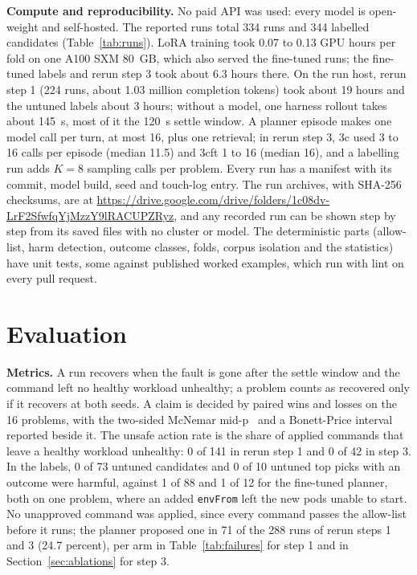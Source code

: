 \documentclass[10pt,conference]{IEEEtran}
\newcommand{\code}[1]{\texttt{\upshape #1}}
\begin{document}
\textbf{Compute and reproducibility.} No paid API was used: every model is open-weight and
self-hosted. The reported runs total 334 runs and 344 labelled candidates (Table~\ref{tab:runs}).
LoRA training took 0.07 to 0.13 GPU hours per fold on one A100 SXM 80~GB, which also served the
fine-tuned runs; the fine-tuned labels and rerun step 3 took about 6.3 hours there. On the run host,
rerun step 1 (224 runs, about 1.03 million completion tokens) took about 19 hours and the untuned
labels about 3 hours; without a model, one harness rollout takes about 145~s, most of it the
120~s settle window. A planner episode makes one model call per turn, at most 16, plus one
retrieval; in rerun step 3, 3c used 3 to 16 calls per episode (median 11.5) and 3cft 1 to 16
(median 16), and a labelling run adds $K=8$ sampling calls per problem. Every run has a manifest
with its commit, model build, seed and touch-log entry. The run archives, with SHA-256 checksums,
are at \url{https://drive.google.com/drive/folders/1c08dv-LrF2SfwfqYjMzzY9lRACUPZRyz}, and any
recorded run can be shown step by step from its saved files with no cluster or model. The
deterministic parts (allow-list, harm detection, outcome classes, folds, corpus isolation and the
statistics) have unit tests, some against published worked examples, which run with lint on every
pull request.

\section{Evaluation}
\label{sec:eval}

\textbf{Metrics.} A run recovers when the fault is gone after the settle window and the command
left no healthy workload unhealthy; a problem counts
as recovered only if it recovers at both seeds. A claim is decided by paired wins and losses on the
16 problems, with the two-sided McNemar mid-p~\cite{fagerland} and a Bonett-Price interval~\cite{bonett}
reported beside it. The unsafe action rate is the share of applied commands that leave a healthy
workload unhealthy: 0 of 141 in rerun step 1 and 0 of 42 in step 3. In the labels, 0 of 73 untuned
candidates and 0 of 10 untuned top picks with an outcome were harmful, against 1 of 88 and 1 of 12
for the fine-tuned planner, both on one problem, where an added \code{envFrom} left the new pods
unable to start. No unapproved command was applied, since every command passes the allow-list
before it runs; the planner proposed one in 71 of the 288 runs of rerun steps 1 and 3 (24.7
percent), per arm in Table~\ref{tab:failures} for step 1 and in Section~\ref{sec:ablations} for
step 3.
\end{document}
